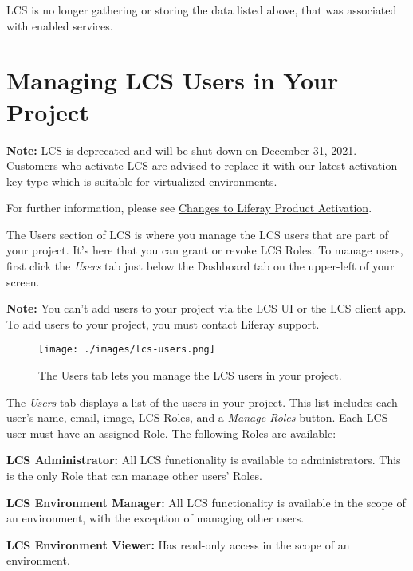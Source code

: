 LCS is no longer gathering or storing the data listed above, that was
associated with enabled services.

\chapter{Managing LCS Users in Your
Project}\label{managing-lcs-users-in-your-project}

\noindent\hrulefill

\textbf{Note:} LCS is deprecated and will be shut down on December 31,
2021. Customers who activate LCS are advised to replace it with our
latest activation key type which is suitable for virtualized
environments.

For further information, please see
\href{https://help.liferay.com/hc/en-us/articles/4402347960845-Changes-to-Liferay-Product-Activation}{Changes
to Liferay Product Activation}.

\noindent\hrulefill

The Users section of LCS is where you manage the LCS users that are part
of your project. It's here that you can grant or revoke LCS Roles. To
manage users, first click the \emph{Users} tab just below the Dashboard
tab on the upper-left of your screen.

\noindent\hrulefill

\textbf{Note:} You can't add users to your project via the LCS UI or the
LCS client app. To add users to your project, you must contact Liferay
support.

\noindent\hrulefill

\begin{figure}
\centering
\texttt{[image: ./images/lcs-users.png]}
\caption{The Users tab lets you manage the LCS users in your project.}
\end{figure}

The \emph{Users} tab displays a list of the users in your project. This
list includes each user's name, email, image, LCS Roles, and a
\emph{Manage Roles} button. Each LCS user must have an assigned Role.
The following Roles are available:

\textbf{LCS Administrator:} All LCS functionality is available to
administrators. This is the only Role that can manage other users'
Roles.

\textbf{LCS Environment Manager:} All LCS functionality is available in
the scope of an environment, with the exception of managing other users.

\textbf{LCS Environment Viewer:} Has read-only access in the scope of an
environment.

